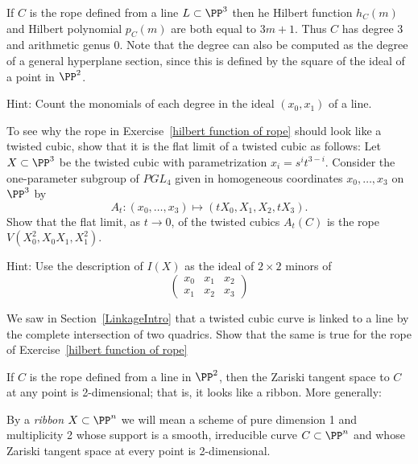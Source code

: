 \begin{exercise}\label{hilbert function of rope}
If $C$ is the rope defined from a line $L\subset \PP^3$ then he Hilbert function $h_C(m)$ and Hilbert polynomial $p_C(m)$ are both equal to $3m+1$. Thus $C$ has degree 3 and
arithmetic genus 0. Note that the degree can also be computed as the degree of 
a general hyperplane section, since this is defined by the square of the ideal of a point
in $\PP^2$.

Hint: Count the monomials of each degree in the ideal $(x_0,x_1)$ of a line. 
\end{exercise}

\begin{exercise} To see why the rope in Exercise~\ref{hilbert function of rope} should look like a twisted cubic, show that it is the flat limit of a twisted cubic as follows:
 Let $X \subset \PP^3$ be the twisted cubic with parametrization $x_i = s^it^{3-i}$. Consider the one-parameter subgroup of $PGL_4$ given in homogeneous coordinates $x_0,\dots, x_3$ on $\PP^3$ by
$$
A_t : (x_0,\dots,x_3) \mapsto (tX_0, X_1, X_2,tX_3).
$$
Show that the flat limit, as $t\to 0$, of the twisted cubics $A_t(C)$ is the rope $V(X_0^2, X_0X_1,X_1^2)$.

Hint: Use the description of $I(X)$ as the ideal of $2\times 2$ minors of
$$
\begin{pmatrix}
 x_0 &x_1&x_2\\
x_1& x_2& x_3
\end{pmatrix}
$$
\end{exercise}
 
 
\begin{exercise}
We saw in Section~\ref{LinkageIntro} that a twisted cubic curve is linked to a line by the complete intersection
 of two quadrics. Show that the same is true for the rope of Exercise~\ref{hilbert function of rope} 
\end{exercise}
 
If $C$ is the rope defined from a line in $\PP^2$, then the Zariski tangent space to $C$ at
any point is 2-dimensional; that is, it looks like a ribbon. More generally:

\begin{definition}
By a \emph{ribbon} $X \subset \PP^n$ we will mean a scheme of pure dimension 1 and multiplicity 2 whose support is a smooth, irreducible curve $C \subset \PP^n$ and whose Zariski tangent space at every point is 2-dimensional.
\end{definition}


